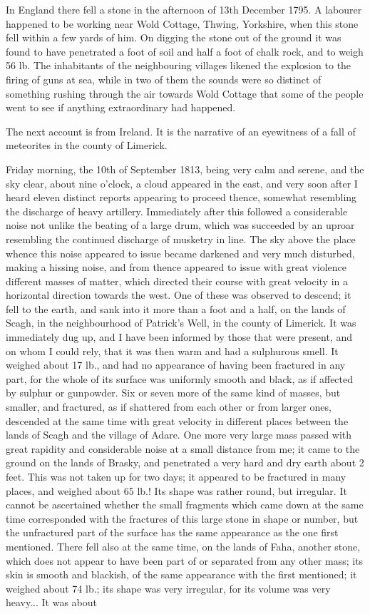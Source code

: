 \documentclass[a4paper, 12pt, oneside, polutonikogreek, english]{article}
\begin{document}
In England there fell a stone in the afternoon of 13th December 1795. A labourer happened to be working near Wold Cottage, Thwing, Yorkshire, when this stone fell within a few yards of him. On digging the stone out of the ground it was found to have penetrated a foot of soil and half a foot of chalk rock, and to weigh 56 lb. The inhabitants of the neighbouring villages likened the explosion to the firing of guns at sea, while in two of them the sounds were so distinct of something rushing through the air towards Wold Cottage that some of the people went to see if anything extraordinary had happened.

The next account is from Ireland. It is the narrative of an eyewitness of a fall of meteorites in the county of Limerick.

Friday morning, the 10th of September 1813, being very calm and serene, and the sky clear, about nine o'clock, a cloud appeared in the east, and very soon after I heard eleven distinct reports appearing to proceed thence, somewhat resembling the discharge of heavy artillery. Immediately after this followed a considerable noise not unlike the beating of a large drum, which was succeeded by an uproar resembling the continued discharge of musketry in line. The sky above the place whence this noise appeared to issue became darkened and very much disturbed, making a hissing noise, and from thence appeared to issue with great violence different masses of matter, which directed their course with great velocity in a horizontal direction towards the west. One of these was observed to descend; it fell to the earth, and sank into it more than a foot and a half, on the lands of Scagh, in the neighbourhood of Patrick's Well, in the county of Limerick. It was immediately dug up, and I have been informed by those that were present, and on whom I could rely, that it was then warm and had a sulphurous smell. It weighed about 17 lb., and had no appearance of having been fractured in any part, for the whole of its surface was uniformly smooth and black, as if affected by sulphur or gunpowder. Six or seven more of the same kind of masses, but smaller, and fractured, as if shattered from each other or from larger ones, descended at the same time with great velocity in different places between the lands of Scagh and the village of Adare. One more very large mass passed with great rapidity and considerable noise at a small distance from me; it came to the ground on the lands of Brasky, and penetrated a very hard and dry earth about 2 feet. This was not taken up for two days; it appeared to be fractured in many places, and weighed about 65 lb.! Its shape was rather round, but irregular. It cannot be ascertained whether the small fragments which came down at the same time corresponded with the fractures of this large stone in shape or number, but the unfractured part of the surface has the same appearance as the one first mentioned. There fell also at the same time, on the lands of Faha, another stone, which does not appear to have been part of or separated from any other mass; its skin is smooth and blackish, of the same appearance with the first mentioned; it weighed about 74 lb.; its shape was very irregular, for its volume was very heavy... It was about 
\end{document}
